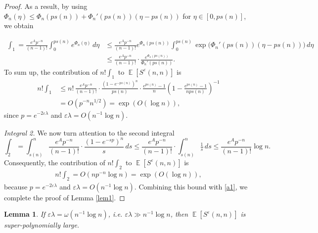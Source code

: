 \documentclass[11pt]{amsart}
\newtheorem{lemma}[theorem]{Lemma}
\newcommand{\E}{\operatorname{\mathbb{E}}}
\def\eps{\varepsilon}
\theoremstyle{remark}
\numberwithin{equation}{section}
\begin{document}
\begin{proof}
As a result, by using $\Phi_n(\eta)\le \Phi_n(ps(n))+\Phi_n'(ps(n))(\eta-ps(n))$ for $\eta\in [0,ps(n)]$, we obtain

\begin{align*}
\int_1 = \frac{e^A p^{-n}}{(n-1)!}\int_0^{ps(n)}\!\!\!e^{\Phi_n(\eta)}\,d \eta&\le\frac{e^{A}p^{-n}}{(n-1)!} e^{\Phi_n(ps(n))}%
\int_0^{ps(n)}\!\!\!\!\exp\bigl(\Phi_n'(ps(n))(\eta-ps(n))\bigr)\,d\eta\\
&\leq \frac{e^{A}p^{-n}}{(n-1)!}\cdot\frac{e^{\Phi_n(ps(n))}}{\Phi_n'(ps(n))}.
\end{align*}
To sum up, the contribution of $n! \int_1$ to $\E[S^{\eps}(n,n)]$ is
\begin{equation}\label{a1}
\begin{aligned}
    n! \int_1 
    &\leq n!\, \tfrac{e^{A}p^{-n}}{(n-1)!}\cdot\frac{(1-e^{-ps(n)})^n}{ps(n)}\cdot \frac{e^{ps(n)}-1}{n} \left(1-\frac{e^{ps(n)}-1}{nps(n)}\right)^{-1}\\
    & = O(p^{-n}n^{1/2})=\exp(O(\log n)),
\end{aligned}
\end{equation}
since $p=e^{-2\eps \lambda}$ and $\eps\lambda=O(n^{-1}\log n)$.\bigskip

\noindent \textit{Integral 2.} We now turn attention to the second integral
\begin{equation*}
 \int_2 = \int_{s(n)}^{n}\frac{e^Ap^{-n}}{(n-1)!}\cdot\frac{(1-e^{-sp})^n}{s}\,ds
\leq \frac{e^Ap^{-n}}{(n-1)!}\cdot \int_{s(n)}^{n}\tfrac{1}{s}\,ds \leq \frac{e^Ap^{-n}}{(n-1)!} \log n.
\end{equation*}
Consequently, the contribution of $n! \int_2$ to $\E[S^{\eps}(n,n)]$ is 
\begin{align*}
 n! \int_2 = O \left(n p^{-n} \log n \right)=\exp(O(\log n)),
\end{align*}
because $p=e^{-2\eps \lambda}$ and $\eps\lambda=O(n^{-1}\log n)$. Combining this bound with \eqref{a1}, we complete the proof of Lemma \ref{lem1}.
\end{proof}

\begin{lemma}\label{lem2} If $\eps \lambda =\omega(n^{-1}\log n)$, i.e. $\eps \lambda\gg n^{-1}\log n$, then $\E[S^{\eps}(n,n)]$ is super-polynomially large.
\end{lemma}
\end{document}
